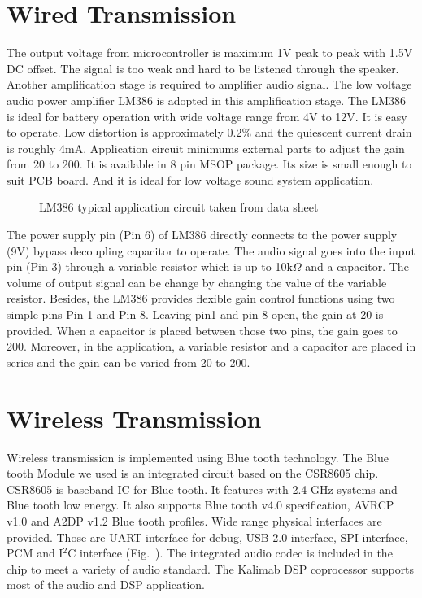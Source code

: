 \section{Wired Transmission}
The output voltage from microcontroller is maximum 1V peak to peak with 1.5V DC offset. The signal is too weak and hard to be listened through the speaker. Another amplification stage is required to amplifier audio signal.
The low voltage audio power amplifier LM386 is adopted in this amplification stage. The LM386 is ideal for battery operation with wide voltage range from 4V to 12V. It is easy to operate. Low distortion is approximately 0.2\% and the quiescent current drain is roughly 4mA. Application circuit minimums external parts to adjust the gain from 20 to 200.  It is available in 8 pin MSOP package. Its size is small enough to suit PCB board. And it is ideal for low voltage sound system application.
\begin{figure}[!htb]
	\centering
	\caption{LM386 typical application circuit taken from data sheet\cite{LM386_datasheet}}
	\label{fig:LM386}
\end{figure}
The power supply pin (Pin 6) of LM386 directly connects to the power supply (9V) bypass decoupling capacitor to operate. The audio signal goes into the input pin (Pin 3) through a variable resistor which is up to 10k$\Omega$ and a capacitor. The volume of output signal can be change by changing the value of the variable resistor.  Besides, the LM386 provides flexible gain control functions using two simple pins Pin 1 and Pin 8. Leaving pin1 and pin 8 open, the gain at 20 is provided. When a capacitor is placed between those two pins, the gain goes to 200.  Moreover, in the application, a variable resistor and a capacitor are placed in series and the gain can be varied from 20 to 200. 

\section{Wireless Transmission}
Wireless transmission is implemented using Blue tooth technology. The Blue tooth Module we used is an integrated circuit based on the CSR8605 chip. CSR8605 is baseband IC for Blue tooth.  It features with 2.4 GHz systems and Blue tooth low energy. It also supports Blue tooth v4.0 specification, AVRCP v1.0 and A2DP v1.2 Blue tooth profiles. Wide range physical interfaces are provided.  Those are UART interface for debug, USB 2.0 interface, SPI interface, PCM and I$^2$C interface (Fig.~). The integrated audio codec is included in the chip to meet a variety of audio standard. The Kalimab DSP coprocessor supports most of the audio and DSP application. 

